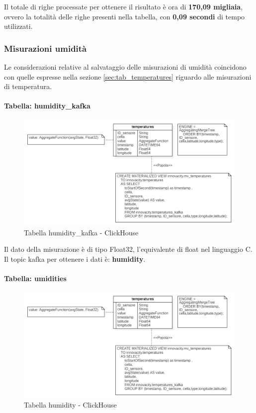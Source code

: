  Il totale di righe processate per ottenere il risultato è ora di \textbf{170,09 migliaia}, ovvero la totalità delle righe presenti nella tabella, con \textbf{0,09 secondi} di tempo utilizzati.

\subsubsection{Misurazioni umidità}
Le considerazioni relative al salvataggio delle misurazioni di umidità coincidono con quelle espresse nella sezione \ref{sec:tab_temperatures} riguardo alle misurazioni di temperatura.
\paragraph{Tabella: humidity\_kafka}
\begin{figure}[H]
    \centering
    \includegraphics[width=1\textwidth]{../Images/SpecificaTecnica/temperatures.PNG}
    \caption{Tabella humidity\_kafka - ClickHouse}
    \label{fig:umidities_kafka}
  \end{figure}
Il dato della misurazione è di tipo Float32, l’equivalente di float nel linguaggio C. Il topic
kafka per ottenere i dati è: \textbf{humidity}.
\paragraph{Tabella: umidities}
\begin{figure}[H]
    \centering
    \includegraphics[width=1\textwidth]{../Images/SpecificaTecnica/temperatures.PNG}
    \caption{Tabella humidity - ClickHouse}
    \label{fig:umidities}
  \end{figure}

